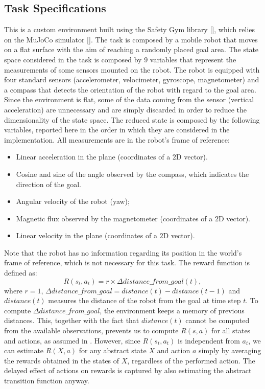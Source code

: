 \subsection*{Task Specifications}
This is a custom environment built using the Safety Gym library [\cite{ray2019benchmarking}], which relies on the MuJoCo simulator [\cite{todorov2012mujoco}]. The task is composed by a mobile robot that moves on a flat surface with the aim of reaching a randomly placed goal area. The state space considered in the task is composed by $9$ variables that represent the measurements of some sensors mounted on the robot. The robot is equipped with four standard sensors (accelerometer, velocimeter, gyroscope, magnetometer) and a compass that detects the orientation of the robot with regard to the goal area. Since the environment is flat, some of the data coming from the sensor (\eg vertical acceleration) are unnecessary and are simply discarded in order to reduce the dimensionality of the state space. 
The reduced state is composed by the following variables, reported here in the order in which they are considered in the implementation. All measurements are in the robot's frame of reference:
\begin{itemize}
	\item Linear acceleration in the plane (coordinates of a $2$D vector).
	\item Cosine and sine of the angle observed by the compass, which indicates the direction of the goal.
	\item Angular velocity of the robot (\wrt yaw);
	\item Magnetic flux observed by the magnetometer (coordinates of a $2$D vector).
	\item Linear velocity in the plane (coordinates of a $2$D vector).
\end{itemize}
Note that the robot has no information regarding its position in the world's frame of reference, which is not necessary for this task.
The reward function is defined as:
\[ 
R(s_t, a_t) = r \times \Delta distance\_from\_goal(t),
\]
where $r=1$, $\Delta distance\_from\_goal = distance(t) - distance(t-1)$ and $distance(t)$ measures the distance of the robot from the goal at time step $t$.
To compute $\Delta distance\_from\_goal$, the environment keeps a memory of previous distances. This, together with the fact that $distance(t)$ cannot be computed from the available observations, prevents us to compute $R(s,a)$ for all states and actions, as assumed in . However, since $R(s_t,a_t)$ is independent from $a_t$, we can estimate $R(X,a)$ for any abstract state $X$ and action $a$ simply by averaging the rewards obtained in the states of $X$, regardless of the performed action. The delayed effect of actions on rewards is captured by also estimating the abstract transition function anyway.
